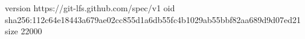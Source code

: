 version https://git-lfs.github.com/spec/v1
oid sha256:112c64e18443a679ae02cc855d1a6db55fc4b1029ab55bbf82aa689d9d07ed21
size 22000
